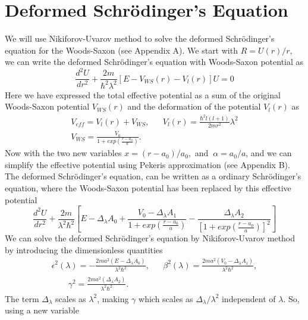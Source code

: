 \documentclass[12pt]{article}
\begin{document}
\section{Deformed Schr\"{o}dinger's Equation}
We will use   Nikiforov-Uvarov method \cite{nu12, nu14}  to solve the deformed Schr\"{o}dinger's equation for the Woods-Saxon (see Appendix A).   We start with  $R = {U(r)}/{r}$,   we can write the deformed 
 Schr\"{o}dinger's equation  with Woods-Saxon potential as  
\begin{equation} \label{GUP_SE2}
\frac{d^2 U}{dr^2} + \frac{2m}{\hbar^2 \lambda^2} \left[E - V_{WS}(r) - V_l(r) \right] U = 0 
\end{equation}  
Here we have expressed the   total  effective potential as a sum of the original Woods-Saxon potential $V_{WS} (r)$ and the deformation of the potential  $V_l (r)$ as 
\begin{eqnarray} \label{eff_V}
	V_{eff} = V_l(r) + V_{WS}, && 
	 V_l(r) = \frac{\hbar^2 l(l+1)}{2mr^2} \lambda^2
\nonumber 	\\
	V_{WS} = \frac{V_0}{1+ exp(\frac{r-a_0}{a})}. && 
\end{eqnarray}
Now with the   two new variables  
$	x = (r- a_0)/a_0,  $ and $ ~ \alpha = {a_0}/{a}$, and we can simplify   the effective potential using   Pekeris approximation (see Appendix B). 
The deformed  Schr\"{o}dinger's equation, can be written as a ordinary Schr\"{o}dinger's equation, where the Woods-Saxon potential has been replaced by this   effective potential
\begin{equation} \label{GUP_SE3}
	\frac{d^2 U}{dr^2} + \frac{2m}{\lambda^2 \hbar^2} \left[ E - \Delta_\lambda A_0 + \frac{V_0 - \Delta_\lambda A_1}{1+ exp(\frac{r-a_0}{a})} - \frac{\Delta_\lambda A_2}{[1+ exp(\frac{r-a_0}{a})]^2} \right]
\end{equation}
We can solve the  deformed Schr\"{o}dinger's equation   by   Nikiforov-Uvarov method  \cite{nu12, nu14}   by  introducing the dimensionless quantities
\begin{eqnarray} \label{para}
	\epsilon^2 (\lambda) =  -\frac{2m a^2 (E - \Delta_\lambda A_0)}{\lambda^2 \hbar^2}, &&  \beta^2(\lambda) = \frac{2m a^2 (V_0 - \Delta_\lambda A_1)}{\lambda^2 \hbar^2}, \nonumber  \\  \qquad \gamma^2  =  \frac{2m a^2 (\Delta_\lambda A_2)}{\lambda^2 \hbar^2}. && 
\end{eqnarray}
The term   $\Delta_\lambda$ scales as $ \lambda^2$, making $\gamma$ which scales  as $\Delta_\lambda/ \lambda^2$ independent of $\lambda$.    So,  using  a new variable 
\end{document}
